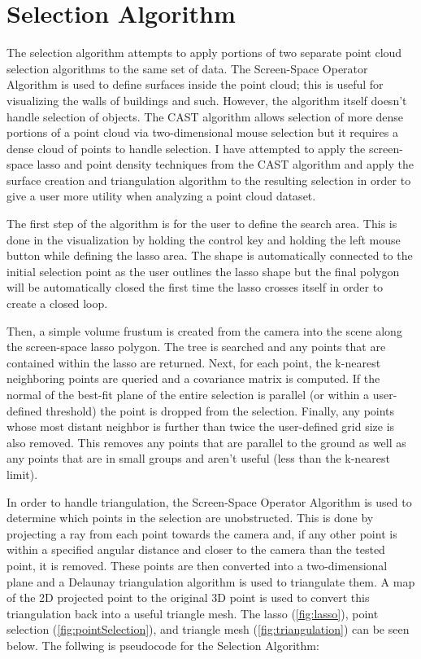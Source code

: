 \section{Selection Algorithm}

The selection algorithm attempts to apply portions of two separate point cloud
selection algorithms to the same set of data. The Screen-Space Operator
Algorithm \cite{1_VAST:VAST11:105-112} is used to define surfaces inside the
point cloud; this is useful for visualizing the walls of buildings and such.
However, the algorithm itself doesn't handle selection of objects. The CAST
algorithm \cite{2_yu:hal-01178051} allows selection of more dense portions of a
point cloud via two-dimensional mouse selection but it requires a dense cloud of
points to handle selection. I have attempted to apply the screen-space lasso and
point density techniques from the CAST algorithm and apply the surface creation
and triangulation algorithm to the resulting selection in order to give a user
more utility when analyzing a point cloud dataset.

The first step of the algorithm is for the user to define the search area. This
is done in the visualization by holding the control key and holding the left
mouse button while defining the lasso area. The shape is automatically connected
to the initial selection point as the user outlines the lasso shape but the
final polygon will be automatically closed the first time the lasso crosses
itself in order to create a closed loop.

Then, a simple volume frustum is created from the camera into the scene along
the screen-space lasso polygon. The tree is searched and any points that are
contained within the lasso are returned. Next, for each point, the k-nearest
neighboring points are queried and a covariance matrix is computed. If the
normal of the best-fit plane of the entire selection is parallel (or within a
user-defined threshold) the point is dropped from the selection. Finally, any
points whose most distant neighbor is further than twice the user-defined grid
size is also removed. This removes any points that are parallel to the ground as
well as any points that are in small groups and aren't useful (less than the
k-nearest limit).

In order to handle triangulation, the Screen-Space Operator Algorithm is used to
determine which points in the selection are unobstructed. This is done by
projecting a ray from each point towards the camera and, if any other point is
within a specified angular distance and closer to the camera than the tested
point, it is removed. These points are then converted into a two-dimensional
plane and a Delaunay triangulation algorithm is used to triangulate them. A map
of the 2D projected point to the original 3D point is used to convert this
triangulation back into a useful triangle mesh. The lasso (\ref{fig:lasso}),
point selection (\ref{fig:pointSelection}), and triangle mesh
(\ref{fig:triangulation}) can be seen below. The follwing is pseudocode for the
Selection Algorithm:

